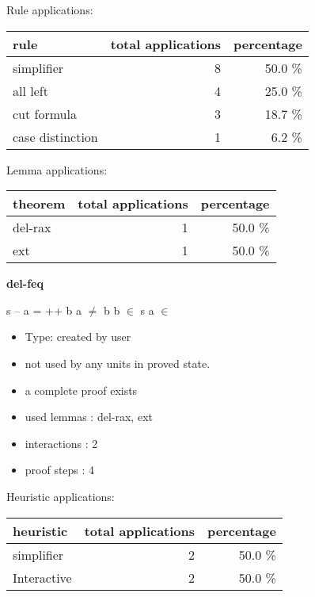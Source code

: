 \documentclass[a4paper]{article}
\begin{document}
Rule applications:

\begin{supertabular}{l|r|r}
rule	        & total applications & percentage \\ \hline
simplifier & 8 & 50.0 \% \\
all left & 4 & 25.0 \% \\
cut formula & 3 & 18.7 \% \\
case distinction & 1 & 6.2 \% \\

\end{supertabular}

Lemma applications:

\begin{supertabular}{l|r|r}
theorem	        & total applications & percentage \\ \hline
del-rax & 1 & 50.0 \% \\
ext & 1 & 50.0 \% \\

\end{supertabular}
\pagebreak

{\LARGE\bf del-feq}\label{lemma-del-feq}

\medskip

 \Fol s -- a =  ++ b \Imp a $\neq$ b \And b $\in$ s \And \Not a $\in$ 

\begin{itemize}

\item Type: created by user

\item not used by any units in proved state.
\item       a complete proof exists
\item       used lemmas  : del-rax, ext
\item       interactions : 2
\item       proof steps  : 4
\end{itemize}

\medskip


Heuristic applications:

\begin{supertabular}{l|r|r}
heuristic	& total applications & percentage \\ \hline
simplifier & 2 & 50.0 \% \\
Interactive & 2 & 50.0 \% \\

\end{supertabular}
\end{document}
